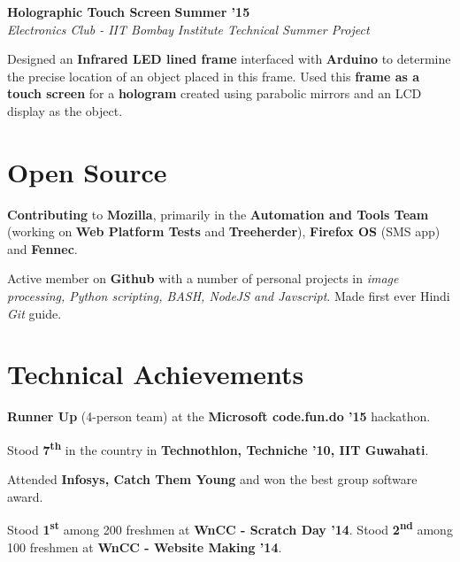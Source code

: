 \documentclass[11pt]{resume}
\begin{document}
\begin{resume}
\textbf{Holographic Touch Screen} \hfill \textbf{Summer '15}\\
\textsl{Electronics Club - IIT Bombay} \hfill \textsl{Institute Technical Summer Project}\\
\vspace{-4mm}
\begin{list2}
\item Designed an \textbf{Infrared LED lined frame} interfaced with \textbf{Arduino} to determine the precise location of an object placed in this frame.
Used this \textbf{frame as a touch screen} for a \textbf{hologram} created using parabolic mirrors and an LCD display as the object.
\end{list2}

\section{\mysidestyle Open Source}

\begin{list2}
\item \textbf{Contributing} to \textbf{Mozilla}, primarily in the \textbf{Automation and Tools Team} (working on \textbf{Web Platform Tests} and \textbf{Treeherder}), \textbf{Firefox OS} (SMS app) and \textbf{Fennec}.
\item Active member on \textbf{Github} with a number of personal projects in \textsl{image processing, Python scripting, BASH, NodeJS and Javscript}.
Made first ever Hindi \textsl{Git} guide.
\end{list2}



\section{\mysidestyle Technical Achievements} 
\begin{list2}
\item\textbf{Runner Up} (4-person team) at the \textbf{Microsoft code.fun.do '15} hackathon.

\item Stood \textbf {7\textsuperscript{th}} in the country in \textbf {Technothlon, Techniche '10, IIT Guwahati}.

\item Attended \textbf{Infosys, Catch Them Young} and won the best group software award. 

\item Stood \textbf {1\textsuperscript{st}} among 200 freshmen at \textbf {WnCC - Scratch Day '14}. Stood \textbf {2\textsuperscript{nd}} among 100 freshmen at \textbf {WnCC - Website Making '14}.




\end{list2}
\end{resume}
\end{document}
